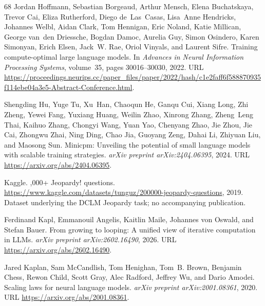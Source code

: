 \documentclass[]{bytedance_seed}
\theoremstyle{definition}
\theoremstyle{remark}
\begin{document}
\begin{thebibliography}{68}
Jordan Hoffmann, Sebastian Borgeaud, Arthur Mensch, Elena Buchatskaya, Trevor
  Cai, Eliza Rutherford, Diego de~Las~Casas, Lisa~Anne Hendricks, Johannes
  Welbl, Aidan Clark, Tom Hennigan, Eric Noland, Katie Millican, George van~den
  Driessche, Bogdan Damoc, Aurelia Guy, Simon Osindero, Karen Simonyan, Erich
  Elsen, Jack~W. Rae, Oriol Vinyals, and Laurent Sifre.
\newblock Training compute-optimal large language models.
\newblock In \emph{Advances in Neural Information Processing Systems},
  volume~35, pages 30016--30030, 2022.
\newblock URL
  \url{https://proceedings.neurips.cc/paper_files/paper/2022/hash/c1e2faff6f588870935f114ebe04a3e5-Abstract-Conference.html}.

Shengding Hu, Yuge Tu, Xu~Han, Chaoqun He, Ganqu Cui, Xiang Long, Zhi Zheng,
  Yewei Fang, Yuxiang Huang, Weilin Zhao, Xinrong Zhang, Zheng~Leng Thai,
  Kaihuo Zhang, Chongyi Wang, Yuan Yao, Chenyang Zhao, Jie Zhou, Jie Cai,
  Zhongwu Zhai, Ning Ding, Chao Jia, Guoyang Zeng, Dahai Li, Zhiyuan Liu, and
  Maosong Sun.
\newblock Minicpm: Unveiling the potential of small language models with
  scalable training strategies.
\newblock \emph{arXiv preprint arXiv:2404.06395}, 2024.
\newblock URL \url{https://arxiv.org/abs/2404.06395}.

{Kaggle}.
,000+ {J}eopardy! questions.
\newblock
  \url{https://www.kaggle.com/datasets/tunguz/200000-jeopardy-questions}, 2019.
\newblock Dataset underlying the DCLM Jeopardy task; no accompanying
  publication.

Ferdinand Kapl, Emmanouil Angelis, Kaitlin Maile, Johannes von Oswald, and
  Stefan Bauer.
\newblock From growing to looping: A unified view of iterative computation in
  {LLM}s.
\newblock \emph{arXiv preprint arXiv:2602.16490}, 2026.
\newblock URL \url{https://arxiv.org/abs/2602.16490}.

Jared Kaplan, Sam McCandlish, Tom Henighan, Tom~B. Brown, Benjamin Chess, Rewon
  Child, Scott Gray, Alec Radford, Jeffrey Wu, and Dario Amodei.
\newblock Scaling laws for neural language models.
\newblock \emph{arXiv preprint arXiv:2001.08361}, 2020.
\newblock URL \url{https://arxiv.org/abs/2001.08361}.


\end{thebibliography}
\end{document}
